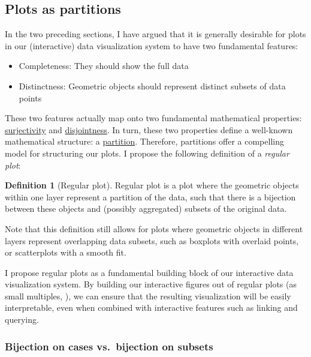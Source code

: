 \documentclass[
]{book}
\providecommand{\tightlist}{%
  \setlength{\itemsep}{0pt}\setlength{\parskip}{0pt}}
\theoremstyle{definition}
\newtheorem{definition}{Definition}[chapter]
\theoremstyle{definition}
\theoremstyle{definition}
\theoremstyle{definition}
\theoremstyle{remark}
\begin{document}
\subsection{Plots as partitions}\label{plots-as-partitions}

In the two preceding sections, I have argued that it is generally desirable for plots in our (interactive) data visualization system to have two fundamental features:

\begin{itemize}
\tightlist
\item
  Completeness: They should show the full data
\item
  Distinctness: Geometric objects should represent distinct subsets of data points
\end{itemize}

These two features actually map onto two fundamental mathematical properties: \hyperref[Functions]{surjectivity} and \hyperref[Partitions]{disjointness}. In turn, these two properties define a well-known mathematical structure: a \hyperref[Partitions]{partition}. Therefore, partitions offer a compelling model for structuring our plots. I propose the following definition of a \emph{regular plot}:

\begin{definition}[Regular plot]
Regular plot is a plot where the geometric objects within one layer represent a partition of the data, such that there is a bijection between these objects and (possibly aggregated) subsets of the original data.
\end{definition}

Note that this definition still allows for plots where geometric objects in different layers represent overlapping data subsets, such as boxplots with overlaid points, or scatterplots with a smooth fit.

I propose regular plots as a fundamental building block of our interactive data visualization system. By building our interactive figures out of regular plots (as small multiples, ), we can ensure that the resulting visualization will be easily interpretable, even when combined with interactive features such as linking and querying.

\subsubsection{Bijection on cases vs.~bijection on subsets}\label{bijection-on-cases-vs.-bijection-on-subsets}
\end{document}
